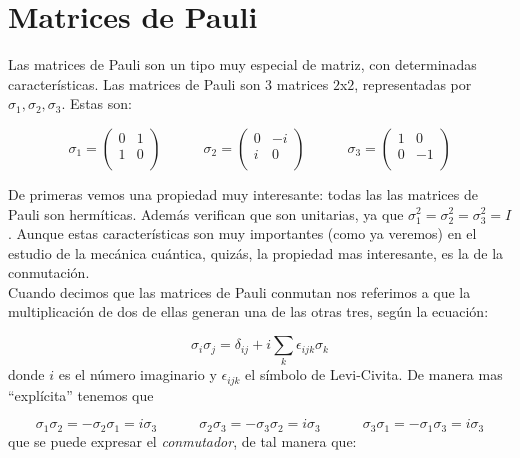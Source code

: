 \documentclass[12pt]{book}
\numberwithin{equation}{chapter}
\numberwithin{figure}{chapter}
\newcommand{\tquad}{\quad \quad \quad}
\begin{document}
\section{Matrices de Pauli}

Las matrices de Pauli son un tipo muy especial de matriz, con determinadas características. Las matrices de Pauli son 3 matrices $2$x$2$, representadas por $\sigma_1,\sigma_2,\sigma_3$. Estas son:

\begin{equation}
\sigma_1 = \begin{pmatrix}
0 & 1 \\
1 & 0 \\ 
\end{pmatrix} \tquad 
\sigma_2 = \begin{pmatrix}
0 & -i \\
i & 0 \\ 
\end{pmatrix} \tquad
\sigma_3 = \begin{pmatrix}
1 & 0 \\
0 & -1 \\ 
\end{pmatrix}
\end{equation}

De primeras vemos una propiedad muy interesante: todas las las matrices de Pauli son hermíticas. Además verifican que son unitarias, ya que $\sigma_1^2 = \sigma_2^2 = \sigma_3^2=I$. Aunque estas características son muy importantes (como ya veremos) en el estudio de la mecánica cuántica, quizás, la propiedad mas interesante, es la de la conmutación. \\

Cuando decimos que las matrices de Pauli conmutan nos referimos a que la multiplicación de dos de ellas generan una de las otras tres, según la ecuación:

\begin{equation}
\sigma_i \sigma_j = \delta_{ij} + i \sum_k \epsilon_{ijk} \sigma_k
\end{equation}
donde $i$ es el número imaginario y $\epsilon_{ijk}$ el símbolo de Levi-Civita. De manera mas ``explícita'' tenemos que

\begin{equation}
\sigma_1 \sigma_2 = - \sigma_2 \sigma_1 = i \sigma_3  \tquad 
\sigma_2 \sigma_3 = - \sigma_3 \sigma_2 = i \sigma_3  \tquad
\sigma_3 \sigma_1 = - \sigma_1 \sigma_3 = i \sigma_3 
\end{equation}
que se puede expresar el \textit{conmutador}, de tal manera que:
\end{document}
